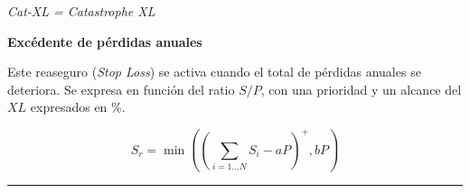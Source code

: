 \begin{f}
\begin{center}
	\emph{ Cat-XL = Catastrophe XL }
\end{center}
\medskip

	
	
	
	



\textbf{Excédente de pérdidas anuales}
	
	
Este reaseguro (\emph{Stop Loss}) se activa cuando el total de pérdidas anuales se deteriora. 
Se expresa en función del ratio \(S/P\), con una prioridad y un alcance del \(XL\) expresados en \%.
	
\[
S_r= \min\left( \left( \sum_{i=1\ldots N} S_i - a  P\right)^+,bP\right)  
\]

\end{f}
\hrule
	
